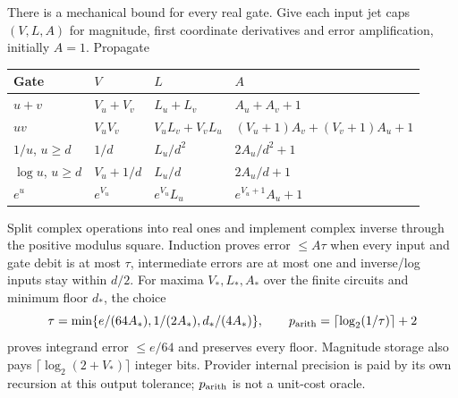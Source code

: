 There is a mechanical bound for every real gate. Give each input jet
caps $(V,L,A)$ for magnitude, first coordinate derivatives and error
amplification, initially $A=1$. Propagate
\begin{center}\small
\begin{tabular}{@{}llll@{}}\toprule
Gate & $V$ & $L$ & $A$\\\midrule
$u+v$ & $V_u+V_v$ & $L_u+L_v$ & $A_u+A_v+1$\\
$uv$ & $V_uV_v$ & $V_uL_v+V_vL_u$
 & $(V_u+1)A_v+(V_v+1)A_u+1$\\
$1/u$, $u\ge d$ & $1/d$ & $L_u/d^2$ & $2A_u/d^2+1$\\
$\log u$, $u\ge d$ & $V_u+1/d$ & $L_u/d$ & $2A_u/d+1$\\
$e^u$ & $e^{V_u}$ & $e^{V_u}L_u$ & $e^{V_u+1}A_u+1$\\\bottomrule
\end{tabular}
\end{center}
Split complex operations into real ones and implement complex inverse
through the positive modulus square. Induction proves error $\le A\tau$
when every input and gate debit is at most $\tau$, intermediate errors
are at most one and inverse/log inputs stay within $d/2$. For maxima
$V_*,L_*,A_*$ over the finite circuits and minimum floor $d_*$,
the choice
\begin{equation}
 \tau=\min\{e/(64A_*),1/(2A_*),d_*/(4A_*)\},\qquad
 p_{\rm arith}=\lceil\log_2(1/\tau)\rceil+2
 \label{eq:ev-arithmetic}
\end{equation}
proves integrand error $\le e/64$ and preserves every floor.
Magnitude storage also pays $\lceil\log_2(2+V_*)\rceil$ integer
bits. Provider internal precision is paid by its own recursion at this
output tolerance; $p_{\rm arith}$ is not a unit-cost oracle.

